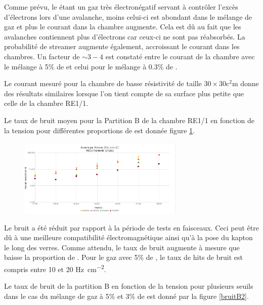 Comme prévu, le  étant un gaz très électronégatif servant à contrôler l'excès d'électrons lors d'une avalanche, moins celui-ci est abondant dans le mélange de gaz et plus le courant dans la chambre augmente. Cela est dû au fait que les avalanches contiennent plus d'électrons car ceux-ci ne sont pas réabsorbés. La probabilité de streamer augmente également, accroissant le courant dans les chambres. Un facteur de $\sim 3-4$ est constaté entre le courant de la chambre avec le mélange à 5\% de  et celui pour le mélange à \num{0.3}\% de .

Le courant mesuré pour la chambre de basse résistivité de taille $\num{30}\times\num{30}\si{\square\centi\meter}$ donne des résultats similaires lorsque l'on tient compte de sa surface plus petite que celle de la chambre RE1/1.

\newpage
Le taux de bruit moyen pour la Partition B de la chambre RE1/1 en fonction de la tension pour différentes proportions de  est donnée figure \ref{bruitB}.

 
 \begin{figure}[ht!]
 	\centering
 	\includegraphics[width=0.705\textwidth]{GLA/NoisvsSF6.png}
 	\label{bruitB}
 \end{figure}
 
 Le bruit a été réduit par rapport à la période de tests en faisceaux. Ceci peut être dû à une meilleure compatibilité électromagnétique ainsi qu'à la pose du kapton le long des verres. Comme attendu, le taux de bruit augmente à mesure que baisse la proportion de . Pour le gaz avec 5\% de , le taux de hits de bruit est compris entre \num{10} et \num{20} \si{\hertz\per\square\centi\meter}.
 
 Le taux de bruit de la partition B en fonction de la tension pour plusieurs seuils dans le cas du mélange de gaz à 5\% et 3\% de  est donné par la figure \ref{bruitB2}.
  
